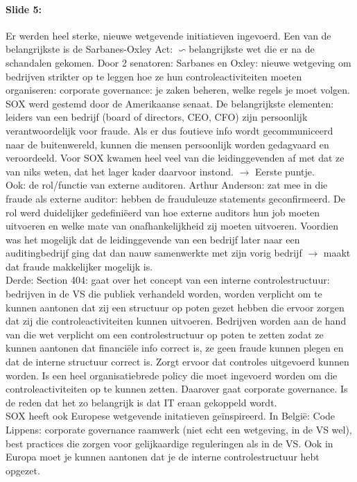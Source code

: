 \documentclass[10pt,a4paper]{report}
\begin{document}
\paragraph{Slide 5:}Er werden heel sterke, nieuwe wetgevende initiatieven ingevoerd. Een van de belangrijkste is de Sarbanes-Oxley Act: $\backsim$belangrijkste wet die er na de schandalen gekomen. Door 2 senatoren: Sarbanes en Oxley: nieuwe wetgeving om bedrijven strikter op te leggen hoe ze hun controleactiviteiten moeten organiseren: corporate governance: je zaken beheren, welke regels je moet volgen. SOX werd gestemd door de Amerikaanse senaat. De belangrijkste elementen: leiders van een bedrijf (board of directors, CEO, CFO) zijn persoonlijk verantwoordelijk voor fraude. Als er dus foutieve info wordt gecommuniceerd naar de buitenwereld, kunnen die mensen persoonlijk worden gedagvaard en veroordeeld. Voor SOX kwamen heel veel van die leidinggevenden af met dat ze van niks weten, dat het lager kader daarvoor instond. $\rightarrow$ Eerste puntje. \\
Ook: de rol/functie van externe auditoren. Arthur Anderson: zat mee in die fraude als externe auditor: hebben de frauduleuze statements geconfirmeerd. De rol werd duidelijker gedefiniëerd van hoe externe auditors hun job moeten uitvoeren en welke mate van onafhankelijkheid zij moeten uitvoeren. Voordien was het mogelijk dat de leidinggevende van een bedrijf later naar een auditingbedrijf ging dat dan nauw samenwerkte met zijn vorig bedrijf $\rightarrow$ maakt dat fraude makkelijker mogelijk is.\\
Derde: Section 404: gaat over het concept van een interne controlestructuur: bedrijven in de VS die publiek verhandeld worden, worden verplicht om te kunnen aantonen dat zij een structuur op poten gezet hebben die ervoor zorgen dat zij die controleactiviteiten kunnen uitvoeren. Bedrijven worden aan de hand van die wet verplicht om een controlestructuur op poten te zetten zodat ze kunnen aantonen dat financiële info correct is, ze geen fraude kunnen plegen en dat de interne structuur correct is. Zorgt ervoor dat controles uitgevoerd kunnen worden. Is een heel organisatiebrede policy die moet ingevoerd worden om die controleactiviteiten op te kunnen zetten. Daarover gaat corporate governance. Is de reden dat het zo belangrijk is dat IT eraan gekoppeld wordt.\\
SOX  heeft ook Europese wetgevende initatieven geïnspireerd. In België: Code Lippens: corporate governance raamwerk (niet echt een wetgeving, in de VS wel), best practices die zorgen voor gelijkaardige reguleringen als in de VS. Ook in Europa moet je kunnen aantonen dat je de interne controlestructuur hebt opgezet.
\end{document}
